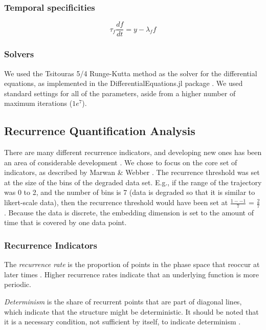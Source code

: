 \documentclass[utf8]{FrontiersinVancouver}
\begin{document}
\subsubsection{Temporal specificities}

\begin{equation}
    \tau_f\frac{df}{dt} = y - \lambda_f f
\end{equation}

\subsubsection{Solvers}

We used the Tsitouras 5/4 Runge-Kutta method as the solver for the differential equations, as implemented in the DifferentialEquations.jl package \citep{tsitourasRungeKuttaPairs2011}. We used standard settings for all of the parameters, aside from a higher number of maximum iterations ($1e^{7}$).  

\subsection{Recurrence Quantification Analysis}

There are many different recurrence indicators, and developing new ones has been an area of considerable development \citep{marwanTrendsRecurrenceAnalysis2023}. We chose to focus on the core set of indicators, as described by Marwan \& Webber \citep{marwanMathematicalComputationalFoundations2015}. The recurrence threshold was set at the size of the bins of the degraded data set. E.g., if the range of the trajectory was 0 to 2, and the number of bins is 7 (data is degraded so that it is similar to likert-scale data), then the recurrence threshold would have been set at $\frac{1--1}{7}$ = $\frac{2}{7}$. Because the data is discrete, the embedding dimension is set to the amount of time that is covered by one data point. 

\subsubsection{Recurrence Indicators}

The \textit{recurrence rate} is the proportion of points in the phase space that reoccur at later times \citep{webber2005recurrence}. Higher recurrence rates indicate that an underlying function is more periodic. 

\textit{Determinism} is the share of recurrent points that are part of diagonal lines, which indicate that the structure might be deterministic. It should be noted that it is a necessary condition, not sufficient by itself, to indicate determinism \citep{marwanHowAvoidPotential2011}.
\end{document}
